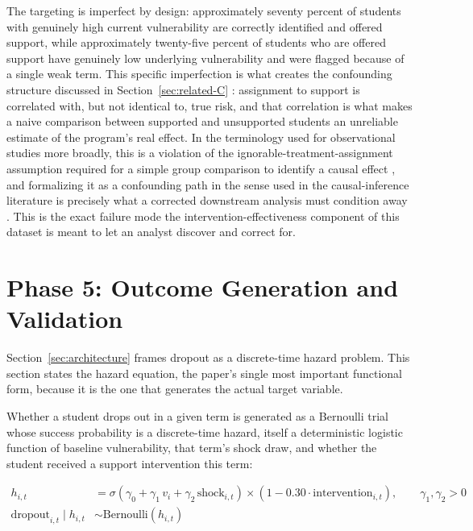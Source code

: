 \documentclass[11pt]{article}
\begin{document}
The targeting is imperfect by design: approximately seventy percent of students with genuinely high current vulnerability are correctly identified and offered support, while approximately twenty-five percent of students who are offered support have genuinely low underlying vulnerability and were flagged because of a single weak term. This specific imperfection is what creates the confounding structure discussed in Section~\ref{sec:related-C} \citep{smith2021}: assignment to support is correlated with, but not identical to, true risk, and that correlation is what makes a naive comparison between supported and unsupported students an unreliable estimate of the program's real effect. In the terminology used for observational studies more broadly, this is a violation of the ignorable-treatment-assignment assumption required for a simple group comparison to identify a causal effect \citep{gelman2020ros}, and formalizing it as a confounding path in the sense used in the causal-inference literature is precisely what a corrected downstream analysis must condition away \citep{peters2017}. This is the exact failure mode the intervention-effectiveness component of this dataset is meant to let an analyst discover and correct for.


\FloatBarrier
\section{Phase 5: Outcome Generation and Validation}
\label{sec:phase5}

Section~\ref{sec:architecture} frames dropout as a discrete-time hazard problem. This section states the hazard equation, the paper's single most important functional form, because it is the one that generates the actual target variable.

Whether a student drops out in a given term is generated as a Bernoulli trial whose success probability is a discrete-time hazard, itself a deterministic logistic function of baseline vulnerability, that term's shock draw, and whether the student received a support intervention this term:

\begin{align}
h_{i,t} &= \sigma\!\left(\gamma_0 + \gamma_1\, v_i + \gamma_2\, \text{shock}_{i,t}\right)\times\left(1 - 0.30 \cdot \text{intervention}_{i,t}\right), \qquad \gamma_1,\gamma_2 > 0 \label{eq:hazard}\\
\text{dropout}_{i,t} \mid h_{i,t} &\sim \text{Bernoulli}(h_{i,t}) \label{eq:dropout}
\end{align}
\end{document}
